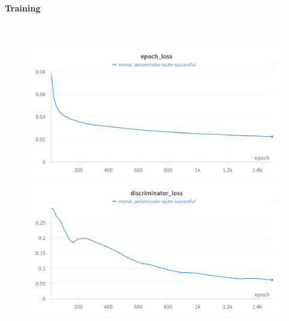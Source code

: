 \paragraph{Training}\mbox{}\\

\begin{figure}[H]
\includegraphics[width=\linewidth]{detailed_engineering/Monai Autoencoder/charts/epoch_loss.png}
\caption{}
\endminipage\hfill
{}
\includegraphics[width=\linewidth]{detailed_engineering/Monai Autoencoder/charts/discriminator_loss.png}
\caption{}
\endminipage
\end{figure}

